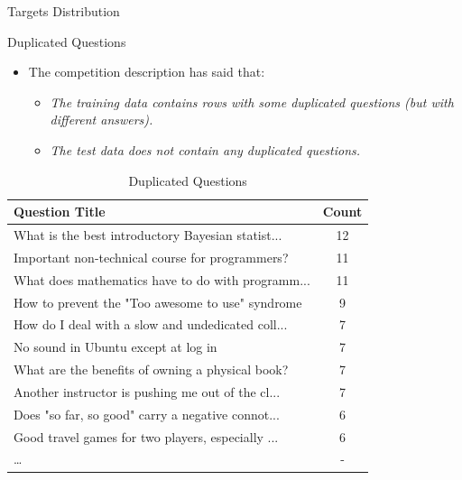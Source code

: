 \documentclass[
 size=12pt,
 paper=smartboard, %
 mode=present, %
 display=slides, %
style=tuliplab,
pauseslide,
fleqn,leqno]{powerdot}
\begin{document}
\begin{slide}{Targets Distribution}
\end{slide}
\begin{slide}{Duplicated Questions}
    \begin{itemize}
        \item The competition description has said that:
        \begin{itemize}
            \item \emph{The training data contains rows with some duplicated questions (but with different answers). }
            \item \emph{The test data does not contain any duplicated questions.}
        \end{itemize}
    \end{itemize}
    \begin{table}[htbp]  
        \centering
        \caption{Duplicated Questions}
		\label{tbl:dup_q}
		\begin{tabular}{lc}
			\hline
			Question Title & Count \\
            \hline
            What is the best introductory Bayesian statist...   &12\\
            Important non-technical course for programmers?	    &11\\
            What does mathematics have to do with programm...   &11\\
            How to prevent the "Too awesome to use" syndrome    & 9\\
            How do I deal with a slow and undedicated coll...   & 7\\
            No sound in Ubuntu except at log in	                & 7\\
            What are the benefits of owning a physical book?    & 7\\
            Another instructor is pushing me out of the cl...   & 7\\
            Does "so far, so good" carry a negative connot...   & 6\\
            Good travel games for two players, especially ...   & 6\\
            \dots&-\\
			\hline
		\end{tabular}
	\end{table}
\end{slide}
\end{document}
